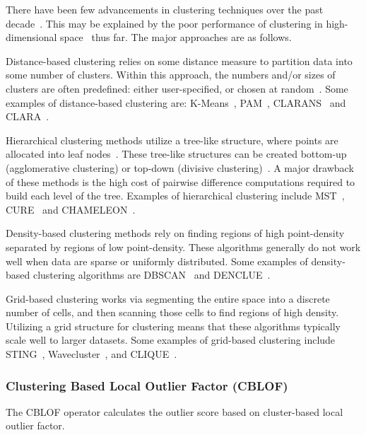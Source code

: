 There have been few advancements in clustering techniques over the past decade~\cite{wang2019progress}.
This may be explained by the poor performance of clustering in high-dimensional space~\cite{zhang2013advancements} thus far.
The major approaches are as follows.

Distance-based clustering relies on some distance measure to partition data into some number of clusters.
Within this approach, the numbers and/or sizes of clusters are often predefined: either user-specified, or chosen at random~\cite{wang2019progress}.
Some examples of distance-based clustering are:
K-Means~\cite{macqueen1967some},
PAM~\cite{kaufman2009finding},
CLARANS~\cite{ng1994efficient} and
CLARA~\cite{kaufman2009finding}.

Hierarchical clustering methods utilize a tree-like structure, where points are allocated into leaf nodes~\cite{wang2019progress}.
These tree-like structures can be created bottom-up (agglomerative clustering) or top-down (divisive clustering)~\cite{agrawal1998automatic}.
A major drawback of these methods is the high cost of pairwise difference computations required to build each level of the tree.
Examples of hierarchical clustering include
MST~\cite{charles_zahn_graph_1971},
CURE~\cite{guha1998cure} and
CHAMELEON~\cite{karypis1999hierarchical}.

Density-based clustering methods rely on finding regions of high point-density separated by regions of low point-density.
These algorithms generally do not work well when data are sparse or uniformly distributed.
Some examples of density-based clustering algorithms are
DBSCAN~\cite{ester1996density} and
DENCLUE~\cite{hinneburg1998efficient}.

Grid-based clustering works via segmenting the entire space into a discrete number of cells, and then scanning those cells to find regions of high density.
Utilizing a grid structure for clustering means that these algorithms typically scale well to larger datasets.
Some examples of grid-based clustering include
STING~\cite{wang1997sting},
Wavecluster~\cite{sheikholeslami2000wavecluster}, and
CLIQUE~\cite{agrawal1998automatic}.

\subsubsection{Clustering Based Local Outlier Factor (CBLOF)}
\label{subsubsec:introduction:related-works:cblof}
The CBLOF operator calculates the outlier score based on cluster-based local outlier factor.

